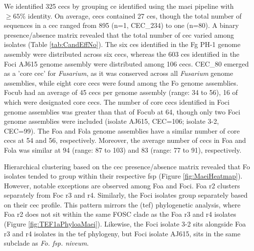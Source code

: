 We identified 325 \acfp{cec} by grouping \ac{ce} identified using the \ac{maei} pipeline with $\geq65\% $ identity. On average, \acp{cec} contained 27 \acp{ce}, though the total number of sequences in a \ac{cec} ranged from 895 (n=1, CEC\_234) to one (n=80). A binary presence/absence matrix revealed that the total number of \ac{cec} varied among isolates (Table \ref{tab:CandEffNo}). The six \acp{ce} identified in the \ac{Fg} PH-1 genome assembly were distributed across six \acp{cec}, whereas the 603 \acp{ce} identified in the \ac{Foci} AJ615 genome assembly were distributed among 106 \acp{cec}. CEC\_80 emerged as a 'core \ac{cec}' for \textit{Fusarium}, as it was conserved across all \textit{Fusarium} genome assemblies, while eight core \acp{cec} were found among the \ac{Fo} genome assemblies. \ac{Focub} had an average of 45 \acp{cec} per genome assembly (range: 34 to 56), 16 of which were designated core \acp{cec}. The number of core \acp{cec} identified in \ac{Foci} genome assemblies was greater than that of \ac{Focub} at 64, though only two \ac{Foci} genome assemblies were included (isolate AJ615, CEC=106; isolate 3-2, CEC=99). The \ac{Foa} and \ac{Fola} genome assemblies have a similar number of core \acp{cec} at 54 and 56, respectively. Moreover, the average number of \acp{cec} in \ac{Foa} and \ac{Fola} was similar at  94 (range: 87 to 103) and 83 (range: 77 to 91), respectively.

Hierarchical clustering based on the \ac{cec} presence/absence matrix revealed that \ac{Fo} isolates tended to group within their respective \ac{fsp} (Figure \ref{fig:MaeiHeatmap}). However, notable exceptions are observed among \ac{Foa} and \ac{Foci}. \ac{Foa} \ac{r2} clusters separately from \ac{Foc} \ac{r3} and \ac{r4}. Similarly, the \ac{Foci} isolates group separately based on their \ac{cec} profile. This pattern mirrors the (\ac{tef}) phylogenetic analysis, where \ac{Foa} \ac{r2} does not sit within the same \ac{FOSC} clade as the \ac{Foa} \ac{r3} and \ac{r4} isolates  (Figure \ref{fig:TEF1aPhyloaMaei}). Likewise, the \ac{Foci} isolate 3-2 sits alongside \ac{Foa} \ac{r3} and \ac{r4} isolates in the \ac{tef} phylogeny, but \ac{Foci} isolate AJ615, sits in the same subclade as \textit{Fo. fsp. niveum}. 

